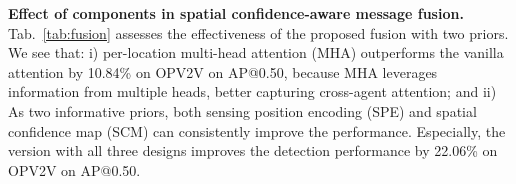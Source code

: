 \textbf{Effect of components in spatial confidence-aware message fusion.} Tab.~\ref{tab:fusion} assesses the effectiveness of the proposed fusion with two priors. We see that: i) per-location multi-head attention (MHA) outperforms the vanilla attention by 10.84\% on OPV2V on AP@0.50, because MHA leverages information from multiple heads, better capturing cross-agent attention; and ii) As two informative priors, both sensing position encoding (SPE) and spatial confidence map (SCM) can consistently improve the performance. Especially, the version with all three designs improves the detection performance by 22.06\% on OPV2V on AP@0.50.
